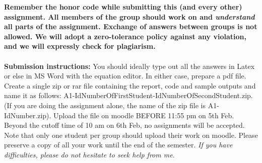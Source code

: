\documentclass[11pt]{article}
\begin{document}
\maketitle

\textbf{Remember the honor code while submitting this (and every other) assignment. All members of the group should work on and \emph{understand} all parts of the assignment. Exchange of answers between groups is not allowed. We will adopt a \textbf{zero-tolerance policy} against any violation, and we will expressly check for plagiarism.}
\\
\\
\textbf{Submission instructions:} You should ideally type out all the answers in Latex or else in MS Word with the equation editor. In either case, prepare a pdf file. Create a single zip or rar file containing the report, code and sample outputs and name it as follows: A1-IdNumberOfFirstStudent-IdNumberOfSecondStudent.zip. (If you are doing the assignment alone, the name of the zip file is A1-IdNumber.zip). Upload the file on moodle BEFORE 11:55 pm on 5th Feb. Beyond the cutoff time of 10 am on 6th Feb, no assignments will be accepted. Note that only one student per group should upload their work on moodle. Please preserve a copy of all your work until the end of the semester. \emph{If you have difficulties, please do not hesitate to seek help from me.} 
\end{document}
